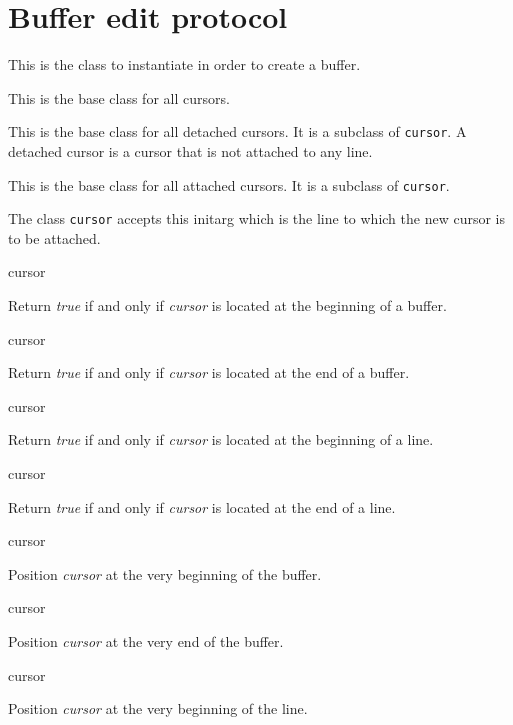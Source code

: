 \chapter{Buffer edit protocol}
\label{chap-edit-protocol}


This is the class to instantiate in order to create a buffer.


This is the base class for all cursors.


This is the base class for all detached cursors.  It is a subclass of
\texttt{cursor}.  A detached cursor is a cursor that is not attached
to any line.


This is the base class for all attached cursors.  It is a subclass of
\texttt{cursor}.


The class \texttt{cursor} accepts this initarg which is the line to
which the new cursor is to be attached.

 {cursor}

Return \textit{true} if and only if \textit{cursor} is located at the
beginning of a buffer.

 {cursor}

Return \textit{true} if and only if \textit{cursor} is located at the
end of a buffer.

 {cursor}

Return \textit{true} if and only if \textit{cursor} is located at the
beginning of a line.

 {cursor}

Return \textit{true} if and only if \textit{cursor} is located at the
end of a line.

 {cursor}

Position \textit{cursor} at the very beginning of the buffer.

 {cursor}

Position \textit{cursor} at the very end of the buffer.

 {cursor}

Position \textit{cursor} at the very beginning of the line.

